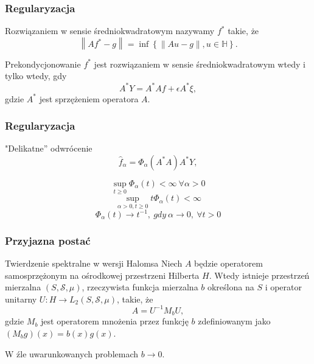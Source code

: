 \documentclass{beamer}
\newcommand{\norm}[1]{\left\lVert#1\right\rVert}
\begin{document}
\begin{frame}\frametitle{Regularyzacja}
\begin{block}{}
Rozwiązaniem w sensie średniokwadratowym nazywamy $f^*$ takie, że
\begin{displaymath}
\norm{Af^*-g}=\inf\left\{\norm{Au-g},u\in \mathbb{H}\right\}.
\end{displaymath}
\end{block}
\begin{block}{Prekondycjonowanie}
$f^*$ jest rozwiązaniem w sensie średniokwadratowym wtedy i tylko wtedy, gdy
\begin{displaymath}
A^*Y=A^*Af+\epsilon A^*\xi,
\end{displaymath}
gdzie $A^*$ jest sprzężeniem operatora $A$.
\end{block}
\end{frame}

\begin{frame}\frametitle{Regularyzacja}
\begin{block}{"Delikatne'' odwrócenie}
\begin{displaymath}
\hat{f}_{\alpha}=\Phi_{\alpha}(A^*A)A^*Y,
\end{displaymath}
\end{block}
\begin{block}{}
\begin{displaymath}
\sup_{t\geq 0}\Phi_{\alpha}(t)<\infty\ \forall \alpha>0
\end{displaymath}
\begin{displaymath}
\sup_{\alpha>0,t\geq 0}t\Phi_{\alpha}(t)<\infty
\end{displaymath}
\begin{displaymath}
\Phi_{\alpha}(t)\to t^{-1},\ gdy\  \alpha\to 0,\ \forall t>0
\end{displaymath}
\end{block}
\end{frame}

\begin{frame}\frametitle{Przyjazna postać}
\begin{block}{Twierdzenie spektralne w wersji Halomsa}
Niech $A$ będzie operatorem samosprzężonym na ośrodkowej przestrzeni Hilberta $H$. Wtedy istnieje przestrzeń mierzalna $(S,\mathcal{S},\mu )$, rzeczywista funkcja mierzalna $b$ określona na $S$ i operator unitarny $U\colon H\to L_2(S,\mathcal{S},\mu )$, takie, że 
\begin{displaymath}
A=U^{-1}M_bU,
\end{displaymath}
gdzie $M_b$ jest operatorem mnożenia przez funkcję $b$ zdefiniowanym jako $(M_bg)(x)=b(x)g(x)$.
\end{block}
\begin{block}{}
\begin{center}
W źle uwarunkowanych problemach $b\to 0$.
\end{center}
\end{block}
\end{frame}
\end{document}
